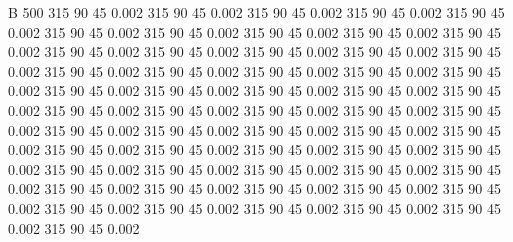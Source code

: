  
 
 
B    500
315            90            45         0.002
315            90            45         0.002
315            90            45         0.002
315            90            45         0.002
315            90            45         0.002
315            90            45         0.002
315            90            45         0.002
315            90            45         0.002
315            90            45         0.002
315            90            45         0.002
315            90            45         0.002
315            90            45         0.002
315            90            45         0.002
315            90            45         0.002
315            90            45         0.002
315            90            45         0.002
315            90            45         0.002
315            90            45         0.002
315            90            45         0.002
315            90            45         0.002
315            90            45         0.002
315            90            45         0.002
315            90            45         0.002
315            90            45         0.002
315            90            45         0.002
315            90            45         0.002
315            90            45         0.002
315            90            45         0.002
315            90            45         0.002
315            90            45         0.002
315            90            45         0.002
315            90            45         0.002
315            90            45         0.002
315            90            45         0.002
315            90            45         0.002
315            90            45         0.002
315            90            45         0.002
315            90            45         0.002
315            90            45         0.002
315            90            45         0.002
315            90            45         0.002
315            90            45         0.002
315            90            45         0.002
315            90            45         0.002
315            90            45         0.002
315            90            45         0.002
315            90            45         0.002
315            90            45         0.002
315            90            45         0.002
315            90            45         0.002
315            90            45         0.002
315            90            45         0.002
315            90            45         0.002
315            90            45         0.002
315            90            45         0.002
315            90            45         0.002
